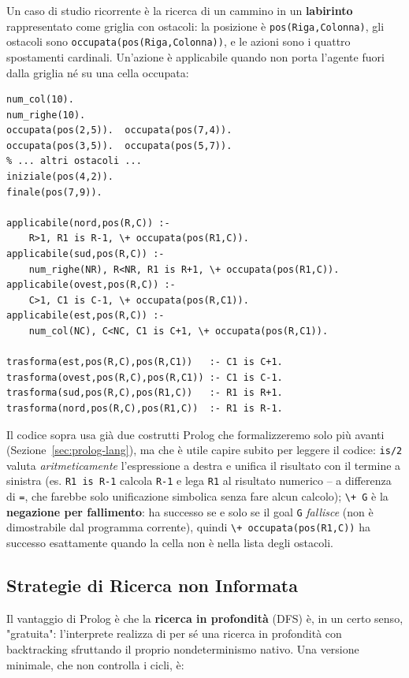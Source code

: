 \documentclass[a4paper,11pt]{article}
\begin{document}
Un caso di studio ricorrente è la ricerca di un cammino in un \textbf{labirinto} rappresentato come griglia con ostacoli: la posizione è \texttt{pos(Riga,Colonna)}, gli ostacoli sono \texttt{occupata(pos(Riga,Colonna))}, e le azioni sono i quattro spostamenti cardinali. Un'azione è applicabile quando non porta l'agente fuori dalla griglia né su una cella occupata:

\begin{lstlisting}
num_col(10).
num_righe(10).
occupata(pos(2,5)).  occupata(pos(7,4)).
occupata(pos(3,5)).  occupata(pos(5,7)).
% ... altri ostacoli ...
iniziale(pos(4,2)).
finale(pos(7,9)).

applicabile(nord,pos(R,C)) :-
    R>1, R1 is R-1, \+ occupata(pos(R1,C)).
applicabile(sud,pos(R,C)) :-
    num_righe(NR), R<NR, R1 is R+1, \+ occupata(pos(R1,C)).
applicabile(ovest,pos(R,C)) :-
    C>1, C1 is C-1, \+ occupata(pos(R,C1)).
applicabile(est,pos(R,C)) :-
    num_col(NC), C<NC, C1 is C+1, \+ occupata(pos(R,C1)).

trasforma(est,pos(R,C),pos(R,C1))   :- C1 is C+1.
trasforma(ovest,pos(R,C),pos(R,C1)) :- C1 is C-1.
trasforma(sud,pos(R,C),pos(R1,C))   :- R1 is R+1.
trasforma(nord,pos(R,C),pos(R1,C))  :- R1 is R-1.
\end{lstlisting}

Il codice sopra usa già due costrutti Prolog che formalizzeremo solo più avanti (Sezione~\ref{sec:prolog-lang}), ma che è utile capire subito per leggere il codice: \texttt{is/2} valuta \emph{aritmeticamente} l'espressione a destra e unifica il risultato con il termine a sinistra (es. \texttt{R1 is R-1} calcola \texttt{R-1} e lega \texttt{R1} al risultato numerico -- a differenza di \texttt{=}, che farebbe solo unificazione simbolica senza fare alcun calcolo); \texttt{\textbackslash+ G} è la \textbf{negazione per fallimento}: ha successo se e solo se il goal \texttt{G} \emph{fallisce} (non è dimostrabile dal programma corrente), quindi \texttt{\textbackslash+ occupata(pos(R1,C))} ha successo esattamente quando la cella non è nella lista degli ostacoli.

\subsection{Strategie di Ricerca non Informata}

Il vantaggio di Prolog è che la \textbf{ricerca in profondità} (DFS) è, in un certo senso, "gratuita": l'interprete realizza di per sé una ricerca in profondità con backtracking sfruttando il proprio nondeterminismo nativo. Una versione minimale, che non controlla i cicli, è:
\end{document}
